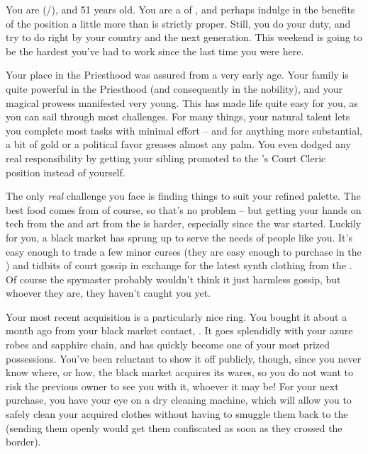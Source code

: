 \documentclass[char]{GL2020}
\begin{document}
\name{\cHedonist{}}

You are \cHedonist{\full} (\cHedonist{\they}/\cHedonist{\them}), and 51 years old. You are a \cHedonist{\cleric} of \cFarmGod{}, and perhaps indulge in the benefits of the position a little more than is strictly proper. Still, you do your duty, and try to do right by your country and the next generation. This weekend is going to be the hardest you've had to work since the last time you were here.

Your place in the Priesthood was assured from a very early age. Your family is quite powerful in the Priesthood (and consequently in the nobility), and your magical prowess manifested very young. This has made life quite easy for you, as you can sail through most challenges. For many things, your natural talent lets you complete most tasks with minimal effort -- and for anything more substantial, a bit of gold or a political favor greases almost any palm. You even dodged any real responsibility by getting your sibling promoted to the \cQueen{\Majesty}'s Court Cleric position instead of yourself.

The only \emph{real} challenge you face is finding things to suit your refined palette. The best food comes from \pFarm{} of course, so that's no problem -- but getting your hands on tech from the \pTech{} and art from the \pShip{} is harder, especially since the war started. Luckily for you, a black market has sprung up to serve the needs of people like you. It's easy enough to trade a few minor curses (they are easy enough to purchase in the \pFarm{}) and tidbits of court gossip in exchange for the latest synth clothing from the \pTech{}. Of course the \pFarm{} spymaster probably wouldn't think it just harmless gossip, but whoever they are, they haven't caught you yet. 

Your most recent acquisition is a particularly nice ring. You bought it about a month ago from your black market contact, \cChupSecond{\full}. It goes splendidly with your azure robes and sapphire chain, and has quickly become one of your most prized possessions. You've been reluctant to show it off publicly, though, since you never know where, or how, the black market acquires its wares, so you do not want to risk the previous owner to see you with it, whoever it may be! For your next purchase, you have your eye on a dry cleaning machine, which will allow you to safely clean your acquired clothes without having to smuggle them back to the \pTech{} (sending them openly would get them confiscated as soon as they crossed the border).
\end{document}
